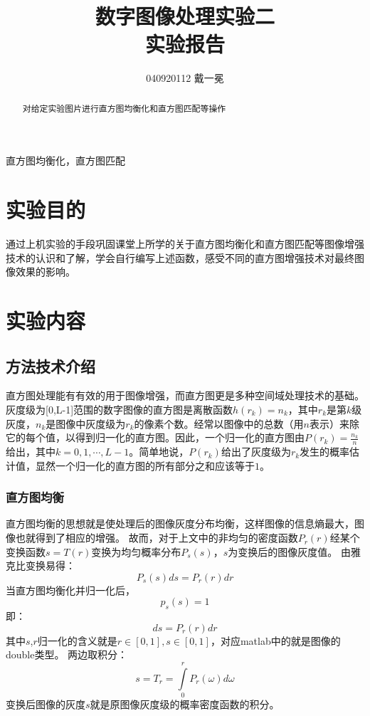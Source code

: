\documentclass[]{IEEEphot}
\begin{document}
\title{数字图像处理实验二\\实验报告}
\author{040920112 戴一冕}
\maketitle
{}
\begin{abstract}
  对给定实验图片进行直方图均衡化和直方图匹配等操作
\end{abstract}
\begin{IEEEkeywords}
	直方图均衡化，直方图匹配
\end{IEEEkeywords}
\section{实验目的}
通过上机实验的手段巩固课堂上所学的关于直方图均衡化和直方图匹配等图像增强技术的认识和了解，学会自行编写上述函数，感受不同的直方图增强技术对最终图像效果的影响。
\section{实验内容}
\subsection{方法技术介绍}
直方图处理能有有效的用于图像增强，而直方图更是多种空间域处理技术的基础。
灰度级为[0,L-1]范围的数字图像的直方图是离散函数$h(r_k)=n_k$，其中$r_k$是第$k$级灰度，$n_k$是图像中灰度级为$r_k$的像素个数。经常以图像中的总数（用$n$表示）来除它的每个值，以得到归一化的直方图。因此，一个归一化的直方图由$P(r_k)=\frac{n_k}{n}$给出，其中$k=0,1,\cdots,L-1$。简单地说，$P(r_k)$给出了灰度级为$r_k$发生的概率估计值，显然一个归一化的直方图的所有部分之和应该等于$1$。
\subsubsection{直方图均衡}
直方图均衡的思想就是使处理后的图像灰度分布均衡，这样图像的信息熵最大，图像也就得到了相应的增强。
故而，对于上文中的非均匀的密度函数$P_r(r)$经某个变换函数$s=T(r)$变换为均匀概率分布$P_s(s)$，$s$为变换后的图像灰度值。
由雅克比变换易得：
\begin{equation}
	P_s(s)ds=P_r(r)dr
	\label{eql}
\end{equation}
当直方图均衡化并归一化后，
\begin{equation}
	p_s(s)=1
	\label{eql}
\end{equation}
即：
\begin{equation}
	ds=P_r(r)dr
	\label{eql}
\end{equation}
其中$s$,$r$归一化的含义就是$r\in[0,1],s\in[0,1]$，对应matlab中的就是图像的double类型。
两边取积分：
\begin{equation}
	s=T_r=\int\limits_{0}^{r}P_r(\omega)d\omega
	\label{eql}
\end{equation}
变换后图像的灰度$s$就是原图像灰度级的概率密度函数的积分。
\end{document}
